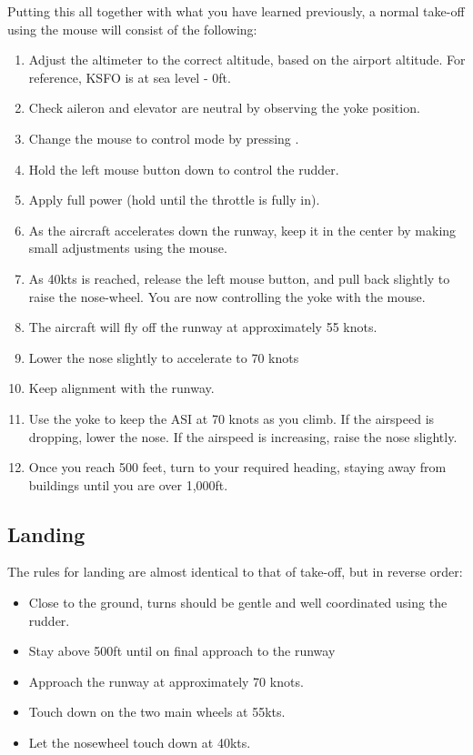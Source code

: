 Putting this all together with what you have learned previously, a normal
take-off using the mouse will consist of the following:

\begin{enumerate}
  \item Adjust the altimeter to the correct altitude, based on the airport
  altitude. For reference, KSFO is at sea level - 0ft.
    \item Check aileron and elevator are neutral by observing the yoke position.
  \item Change the mouse to control mode by pressing .
  \item Hold the left mouse button down to control the rudder.
  \item Apply full power (hold  until the throttle is fully in).
  \item As the aircraft accelerates down the runway, keep it in the center by
  making small adjustments using the mouse.
  \item As 40kts is reached, release the left mouse button, and pull back
  slightly to raise the nose-wheel. You are now controlling the yoke with the
  mouse.
  \item The aircraft will fly off the runway at approximately 55 knots.
  \item Lower the nose slightly to accelerate to 70 knots
  \item Keep alignment with the runway.
  \item Use the yoke to keep the ASI at 70 knots as you climb. If the airspeed
  is dropping, lower the nose. If the airspeed is increasing, raise the nose
  slightly.
  \item Once you reach 500 feet, turn to your required heading, staying away from
  buildings until you are over 1,000ft.
\end{enumerate}

\subsection{Landing}
\label{sec:Ladowanie}

The rules for landing are almost identical to that of take-off, but in reverse
order:
\begin{itemize}
    \item Close to the ground, turns should be gentle and well coordinated
  using the rudder.
  \item Stay above 500ft until on final approach to the runway
    \item Approach the runway at approximately 70 knots.
    \item Touch down on the two main wheels at 55kts.
  \item Let the nosewheel touch down at 40kts.
\end{itemize}

